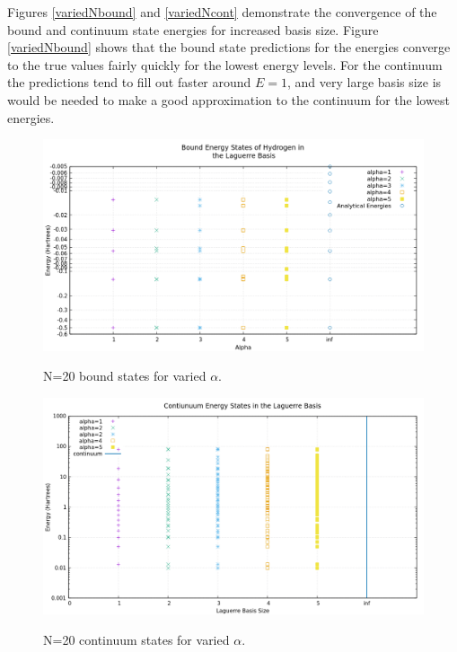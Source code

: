 \documentclass{article}
\begin{document}
	Figures \ref{variedNbound} and \ref{variedNcont} demonstrate the convergence of the bound and continuum state energies for increased basis size. Figure \ref{variedNbound} shows that the bound state predictions for the energies converge to the true values fairly quickly for the lowest energy levels. For the continuum the predictions tend to fill out faster around $E=1$, and very large basis size is would be needed to make a good approximation to the continuum for the lowest energies. 
	
	\begin{figure}[H]
		\centering
		\includegraphics[scale=0.62]{Images/varieda.png}\\
		\caption{N=20 bound states for varied $\alpha$.}
		\label{variedalpha}
	\end{figure}
	\begin{figure}[H]
		\centering
		\includegraphics[scale=0.62]{Images/variedacont.png}\\
		\caption{N=20 continuum states for varied $\alpha$.}
		\label{variedalphacont}
	\end{figure}
	
\end{document}
